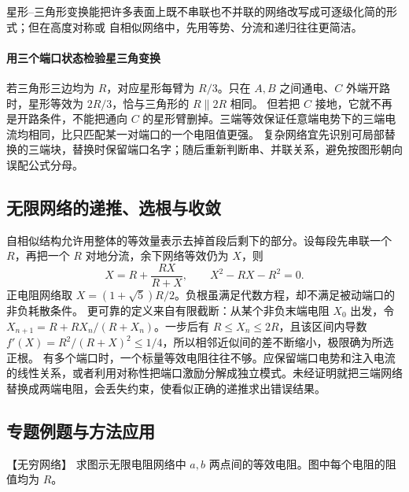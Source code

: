 {\par\noindent\begin{minipage}{\linewidth}
\deltaStarFigure
{}
\end{minipage}\par\medskip

星形--三角形变换能把许多表面上既不串联也不并联的网络改写成可逐级化简的形式；但在高度对称或
自相似网络中，先用等势、分流和递归往往更简洁。

\paragraph{用三个端口状态检验星三角变换}
若三角形三边均为 $R$，对应星形每臂为 $R/3$。只在 $A,B$ 之间通电、$C$ 外端开路时，星形等效为 $2R/3$，恰与三角形的 $R\parallel2R$ 相同。
但若把 $C$ 接地，它就不再是开路条件，不能把通向 $C$ 的星形臂删掉。三端等效保证任意端电势下的三端电流均相同，比只匹配某一对端口的一个电阻值更强。
复杂网络宜先识别可局部替换的三端块，替换时保留端口名字；随后重新判断串、并联关系，避免按图形朝向误配公式分母。




\subsection{无限网络的递推、选根与收敛}
自相似结构允许用整体的等效量表示去掉首段后剩下的部分。设每段先串联一个 $R$，再把一个 $R$ 对地分流，余下网络等效仍为 $X$，则
\[
 X=R+\frac{RX}{R+X},\qquad X^2-RX-R^2=0.
\]
正电阻网络取 $X=(1+\sqrt5)R/2$。负根虽满足代数方程，却不满足被动端口的非负耗散条件。
更可靠的定义来自有限截断：从某个非负末端电阻 $X_0$ 出发，令 $X_{n+1}=R+RX_n/(R+X_n)$。一步后有 $R\le X_n\le2R$，且该区间内导数
$f'(X)=R^2/(R+X)^2\le1/4$，所以相邻近似间的差不断缩小，极限确为所选正根。
有多个端口时，一个标量等效电阻往往不够。应保留端口电势和注入电流的线性关系，或者利用对称性把端口激励分解成独立模式。未经证明就把三端网络替换成两端电阻，会丢失约束，使看似正确的递推求出错误结果。


\subsection{专题例题与方法应用}

\begin{origexamplebox}{【无穷网络】}\label{ch21:ex:s37-6-7}
求图示无限电阻网络中 $a,b$ 两点间的等效电阻。图中每个电阻的阻值均为 $R$。
\par\noindent\begin{minipage}{\linewidth}
\infiniteLadderProblemFigure
{}
\end{minipage}\par\medskip
\end{origexamplebox}\par\nopagebreak[4]


}
